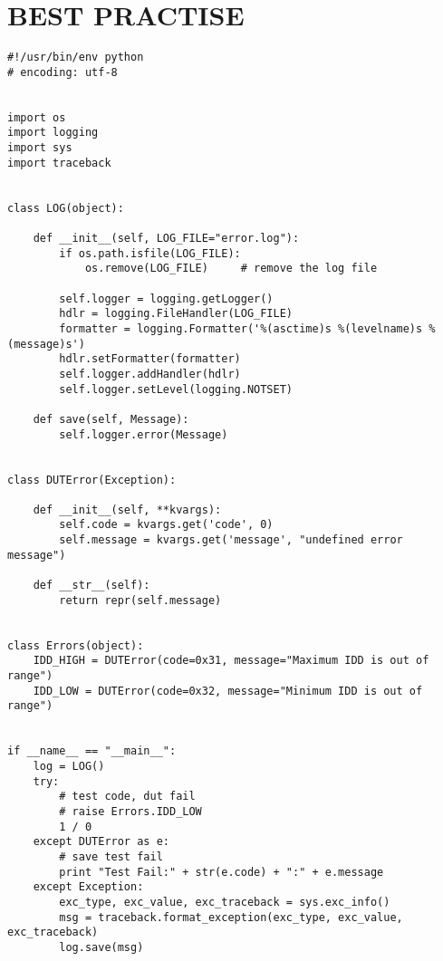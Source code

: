 \newpage
\section{BEST PRACTISE}
\begin{lstlisting}
#!/usr/bin/env python
# encoding: utf-8


import os
import logging
import sys
import traceback


class LOG(object):

    def __init__(self, LOG_FILE="error.log"):
        if os.path.isfile(LOG_FILE):
            os.remove(LOG_FILE)     # remove the log file

        self.logger = logging.getLogger()
        hdlr = logging.FileHandler(LOG_FILE)
        formatter = logging.Formatter('%(asctime)s %(levelname)s %(message)s')
        hdlr.setFormatter(formatter)
        self.logger.addHandler(hdlr)
        self.logger.setLevel(logging.NOTSET)

    def save(self, Message):
        self.logger.error(Message)


class DUTError(Exception):

    def __init__(self, **kvargs):
        self.code = kvargs.get('code', 0)
        self.message = kvargs.get('message', "undefined error message")

    def __str__(self):
        return repr(self.message)


class Errors(object):
    IDD_HIGH = DUTError(code=0x31, message="Maximum IDD is out of range")
    IDD_LOW = DUTError(code=0x32, message="Minimum IDD is out of range")


if __name__ == "__main__":
    log = LOG()
    try:
        # test code, dut fail
        # raise Errors.IDD_LOW
        1 / 0
    except DUTError as e:
        # save test fail
        print "Test Fail:" + str(e.code) + ":" + e.message
    except Exception:
        exc_type, exc_value, exc_traceback = sys.exc_info()
        msg = traceback.format_exception(exc_type, exc_value, exc_traceback)
        log.save(msg)

\end{lstlisting}


